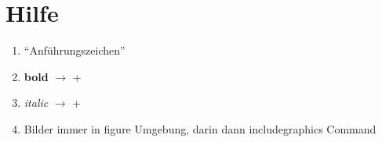 


\renewcommand{\thesisTitle}{Vergleich zwischen Progressive Web Apps und verschiedenen Hybridapp Frameworks anhand von beispielhaften Anwendungen}
\renewcommand{\thesisAuthor}{Patric Bader}
\renewcommand{\thesisAuthorMatrikel}{2137191}
\renewcommand{\thesisFieldOfStudy}{Media Systems}
\renewcommand{\thesisFaculty}{Design, Medien und Information}
\renewcommand{\thesisDepartment}{Medientechnik}
\renewcommand{\thesisFirstExaminer}{Prof. Dr. Andreas Plaß}		%
\renewcommand{\thesisSecondExaminer}{TBD}	%




	\createCover
	\addtocounter{page}{-1}

	\tableoftodos

	\tableofcontents

%	
%	
%	
%	
%	
%	

\chapter{Hilfe}

\begin{enumerate}
	\item "`Anführungszeichen"'
	\item \textbf{bold} $\rightarrow$  + 
	\item \textit{italic} $\rightarrow$  + 
	\item Bilder immer in figure Umgebung, darin dann includegraphics Command
\end{enumerate}

